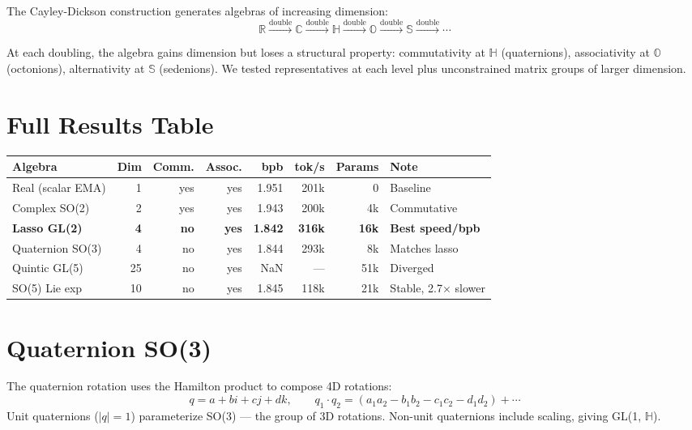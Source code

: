 \documentclass[11pt,a4paper]{report}
\begin{document}
The Cayley-Dickson construction generates algebras of increasing dimension:
\[
\mathbb{R} \xrightarrow{\text{double}} \mathbb{C} \xrightarrow{\text{double}} \mathbb{H} \xrightarrow{\text{double}} \mathbb{O} \xrightarrow{\text{double}} \mathbb{S} \xrightarrow{\text{double}} \cdots
\]

At each doubling, the algebra gains dimension but loses a structural property: commutativity at $\mathbb{H}$ (quaternions), associativity at $\mathbb{O}$ (octonions), alternativity at $\mathbb{S}$ (sedenions). We tested representatives at each level plus unconstrained matrix groups of larger dimension.

\section{Full Results Table}

\begin{center}
\begin{tabular}{lrrrrrrl}
\toprule
Algebra & Dim & Comm. & Assoc. & bpb & tok/s & Params & Note \\
\midrule
Real (scalar EMA) & 1 & yes & yes & 1.951 & 201k & 0 & Baseline \\
Complex SO(2) & 2 & yes & yes & 1.943 & 200k & 4k & Commutative \\
\textbf{Lasso GL(2)} & \textbf{4} & \textbf{no} & \textbf{yes} & \textbf{1.842} & \textbf{316k} & \textbf{16k} & \textbf{Best speed/bpb} \\
Quaternion SO(3) & 4 & no & yes & 1.844 & 293k & 8k & Matches lasso \\
Quintic GL(5) & 25 & no & yes & NaN & --- & 51k & Diverged \\
SO(5) Lie exp & 10 & no & yes & 1.845 & 118k & 21k & Stable, 2.7$\times$ slower \\
\bottomrule
\end{tabular}
\end{center}

\section{Quaternion SO(3)}

The quaternion rotation uses the Hamilton product to compose 4D rotations:
\[
q = a + bi + cj + dk, \qquad q_1 \cdot q_2 = (a_1 a_2 - b_1 b_2 - c_1 c_2 - d_1 d_2) + \cdots
\]
Unit quaternions ($|q| = 1$) parameterize SO(3) --- the group of 3D rotations. Non-unit quaternions include scaling, giving GL(1, $\mathbb{H}$).
\end{document}
